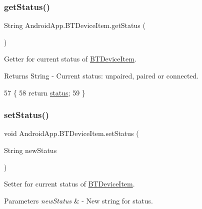 \subsubsection{\texorpdfstring{get\+Status()}{getStatus()}}
{\footnotesize\ttfamily String Android\+App.\+B\+T\+Device\+Item.\+get\+Status (\begin{DoxyParamCaption}{ }\end{DoxyParamCaption})\hspace{0.3cm}{\ttfamily [inline]}}



Getter for current status of \hyperlink{class_android_app_1_1_b_t_device_item}{B\+T\+Device\+Item}. 

\begin{DoxyReturn}{Returns}
String -\/ Current status\+: unpaired, paired or connected. 
\end{DoxyReturn}

\begin{DoxyCode}
57                               \{
58         \textcolor{keywordflow}{return} \hyperlink{class_android_app_1_1_b_t_device_item_a53c37efab7ea4550d4db428b3d6915e0}{status};
59     \}
\end{DoxyCode}
\mbox{\label{class_android_app_1_1_b_t_device_item_a3e7e6d991363b670a71f4634bc5e4f27}} 
\subsubsection{\texorpdfstring{set\+Status()}{setStatus()}}
{\footnotesize\ttfamily void Android\+App.\+B\+T\+Device\+Item.\+set\+Status (\begin{DoxyParamCaption}\item[{String}]{new\+Status }\end{DoxyParamCaption})\hspace{0.3cm}{\ttfamily [inline]}}



Setter for current status of \hyperlink{class_android_app_1_1_b_t_device_item}{B\+T\+Device\+Item}. 


\begin{DoxyParams}{Parameters}
{\em new\+Status} & -\/ New string for status. \\
\hline
\end{DoxyParams}

